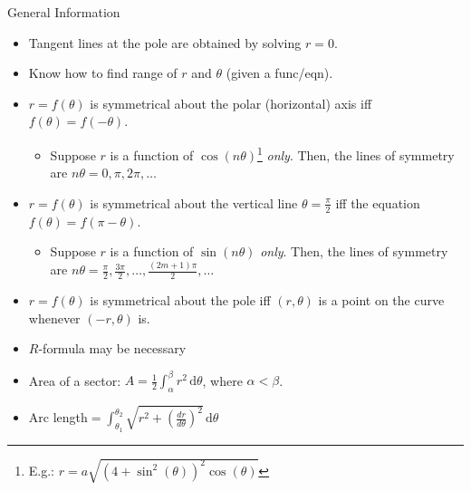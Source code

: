 \documentclass[oneside]{book}
\begin{document}
\begin{stbox}{General Information}{}
\begin{itemize}[label=\(\circ\)]
\begin{longtable}{|Sc|Sc|Sc|}
\begin{tabular}{@{}Sc@{}}
\end{tabular}& \(x^2+\left(y-\frac{a}{2}\right)^2=\frac{a^2}{4}\)\\
\hline
    \end{longtable}
    \item Tangent lines at the pole are obtained by solving \(r=0\).
    \item Know how to find range of \(r\) and \(\theta\) (given a func/eqn).
    \item \(r=f(\theta)\) is symmetrical about the polar (horizontal) axis iff \(f(\theta)=f(-\theta)\).
    \begin{itemize}
      \item Suppose \(r\) is a function of \(\cos(n\theta)\)\footnote{E.g.: \(r=a\sqrt{(4+\sin^2(\theta))^2\cos(\theta)}\)} \emph{only}. Then, the lines of symmetry are \(n\theta=0,\pi,2\pi,\ldots\)
    \end{itemize}
    \item \(r=f(\theta)\) is symmetrical about the vertical line \(\theta=\frac{\pi}{2}\) iff the equation \(f(\theta)=f(\pi-\theta)\).
    \begin{itemize}
      \item Suppose \(r\) is a function of \(\sin(n\theta)\) \emph{only}. Then, the lines of symmetry are \(n\theta=\frac{\pi}{2},\frac{3\pi}{2},\ldots,\frac{(2m+1)\pi}{2},\ldots\)
    \end{itemize}
    \item \(r=f(\theta)\) is symmetrical about the pole iff \((r,\theta)\) is a point on the curve whenever \((-r,\theta)\) is.
    \item \(R\)-formula may be necessary
    \item Area of a sector: \(A=\frac{1}{2}\int_{\alpha}^{\beta}r^2\,\text{d}\theta\), where \(\alpha<\beta\).
    \item Arc length\(=\int_{\theta_1}^{\theta_2} \sqrt{r^2+\left(\frac{dr}{d\theta}\right)^2}\,\text{d}\theta\)
  \end{itemize}
\end{stbox}
\end{document}
